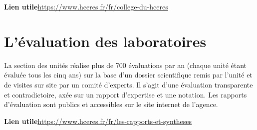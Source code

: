 \textbf{Lien utile\hspace{.5em}}\url{https://www.hceres.fr/fr/college-du-hceres}


%
%
%



%
%

\section{L'\'evaluation des laboratoires}

La section des unit\'es r\'ealise plus de 700 \'evaluations par an
(chaque unit\'e \'etant \'evalu\'ee tous les cinq ans) sur la base d'un dossier scientifique
remis par l'unit\'e et de visites sur site par un comit\'e d'experts.
Il s'agit d'une \'evaluation transparente et contradictoire,
ax\'ee sur un rapport d'expertise et une notation.
Les rapports d'\'evaluation sont publics et accessibles sur le site internet de l'agence.

\textbf{Lien utile\hspace{.5em}}\url{https://www.hceres.fr/fr/les-rapports-et-syntheses}
 
